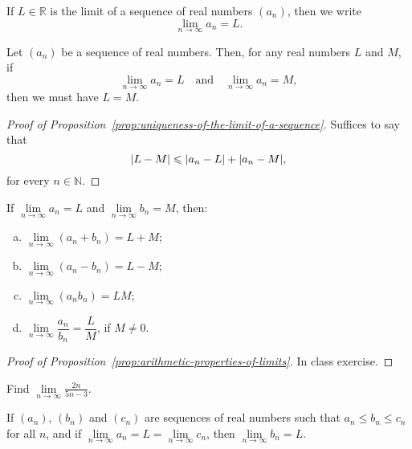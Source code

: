 If $L\in\mathbb{R}$ is the limit of a sequence of real numbers $(a_{n})$, then we write
\[
  \lim\limits_{n\to\infty}a_{n}=L.
\]

\begin{proposition}\label{prop:uniqueness-of-the-limit-of-a-sequence}
  Let $(a_{n})$ be a sequence of real numbers. Then, for any real numbers $L$ and $M$, if
  \[
    \lim\limits_{n\to\infty}a_{n}=L\quad\text{and}\quad\lim\limits_{n\to\infty}a_{n}=M,
  \]
  then we must have $L=M$.
\end{proposition}

\begin{proof}[Proof of Proposition~\ref{prop:uniqueness-of-the-limit-of-a-sequence}]
  Suffices to say that
  \[
    \lvert L-M\rvert\leqslant{\lvert a_{n}-L\rvert+\lvert a_{n}-M\rvert},
  \]
  for every $n\in\mathbb{N}$.
\end{proof}

\begin{proposition}\label{prop:arithmetic-properties-of-limits}
  If $\lim\limits_{n\to\infty}a_{n}=L$ and $\lim\limits_{n\to\infty}b_{n}=M$, then:
  \begin{enumerate}[(a)]
    \item
      $\lim\limits_{n\to\infty}(a_{n}+b_{n})=L+M$;
    \item
      $\lim\limits_{n\to\infty}(a_{n}-b_{n})=L-M$;
    \item
      $\lim\limits_{n\to\infty}(a_{n}b_{n})=LM$;
    \item
      $\lim\limits_{n\to\infty}\dfrac{a_{n}}{b_{n}}=\dfrac{L}{M}$, if $M\neq{0}$.
  \end{enumerate}
\end{proposition}

\begin{proof}[Proof of Proposition~\ref{prop:arithmetic-properties-of-limits}]
  In class exercise.
\end{proof}

\begin{example}
  Find $\lim\limits_{n\to\infty}\frac{2n}{5n-3}$.
\end{example}

\begin{theorem}\label{thm:the-sandwich-theorem-for-sequences}
  If $(a_{n})$, $(b_{n})$ and $(c_{n})$ are sequences of real numbers such that $a_{n}\leqslant{b_{n}}\leqslant{c_{n}}$ for all $n$, and if $\lim\limits_{n\to\infty}a_{n}=L=\lim\limits_{n\to\infty}c_{n}$, then $\lim\limits_{n\to\infty}b_{n}=L$.
\end{theorem}

